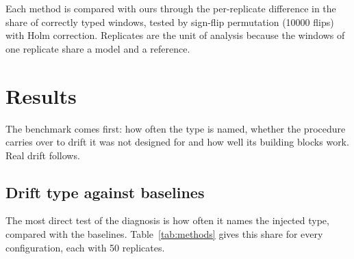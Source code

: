 \documentclass[pdflatex,referee,lineno,sn-basic]{sn-jnl}
\begin{document}
Each method is compared with ours through the per-replicate difference in the share of correctly typed windows, tested by sign-flip permutation (10000 flips) with Holm correction. Replicates are the unit of analysis because the windows of one replicate share a model and a reference.

\section{Results}\label{sec:results}

The benchmark comes first: how often the type is named, whether the procedure carries over to drift it was not designed for and how well its building blocks work. Real drift follows.

\subsection{Drift type against baselines}\label{sec:res-methods}

The most direct test of the diagnosis is how often it names the injected type, compared with the baselines. Table~\ref{tab:methods} gives this share for every configuration, each with 50 replicates.
\end{document}
